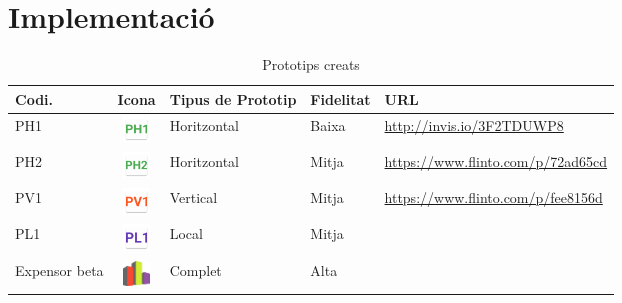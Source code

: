 
\section{Implementació}

\begin{table}
\caption{Prototips creats}
\label{table:prototypes}
\begin{tabular}{ | p{1.6cm} | c | p{1.9cm} | l | l |}
\hline
\textbf{Codi.} & \textbf{Icona} & \textbf{Tipus de Prototip} & \textbf{Fidelitat} & \textbf{URL}\\ 
\hline
PH1 & \includegraphics[width=0.7cm]{PH1.png} & Horitzontal & Baixa & \href{http://invis.io/3F2TDUWP8}{http://invis.io/3F2TDUWP8} \\
\hline
PH2 & \includegraphics[width=0.7cm]{PH2.png} & Horitzontal & Mitja & \href{https://www.flinto.com/p/72ad65cd}{https://www.flinto.com/p/72ad65cd} \\
\hline
PV1 & \includegraphics[width=0.7cm]{PV1.png} & Vertical & Mitja & \href{https://www.flinto.com/p/fee8156d}{https://www.flinto.com/p/fee8156d} \\
\hline
PL1 & \includegraphics[width=0.7cm]{PL1.png} & Local & Mitja &  \\ %
\hline
Expensor beta & \includegraphics[width=0.7cm]{logo.png} & Complet & Alta &  \\ %
\hline
\end{tabular}
\end{table}
